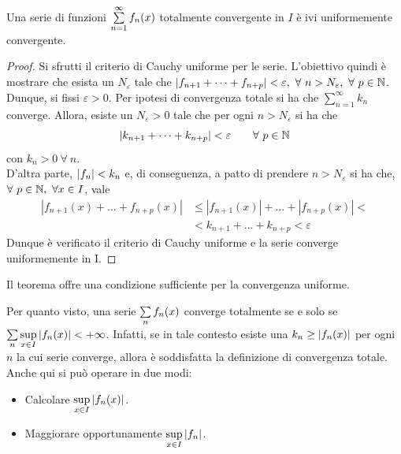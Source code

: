 \begin{theorem} \label{Teo: Criterio di Weierstrass (convergenza totale)}
Una serie di funzioni $\sum\limits_{n=1}^{\infty}{f_n(x)}$ totalmente convergente in $I$ è ivi uniformemente convergente.
\end{theorem}
\begin{proof}
    Si sfrutti il criterio di Cauchy uniforme per le serie. L'obiettivo quindi è mostrare che esista un $N_\varepsilon$ tale che $|f_{n+1}+ \dots+ f_{n+p}|< \varepsilon,\ \forall\ n > N_\varepsilon,\ \forall\ p\in \mathbb{N}$.\\
    Dunque, si fissi $\varepsilon>0$. Per ipotesi di convergenza totale si ha che $\sum\limits_{n=1}^{\infty}{k_n}$ converge. Allora, esiste un $N_\varepsilon>0$ tale che per ogni $n>N_\varepsilon$ si ha che 
    \begin{equation}
        |k_{n+1}+\dots+k_{n+p}|< \varepsilon \qquad \forall\ p \in \mathbb{N}
    \end{equation}
   con $k_n>0\ \forall\ n$.\\
   D'altra parte, $|f_n|<k_n$ e, di conseguenza, a patto di prendere $n> N_\varepsilon$ si ha che, $\forall\ p \in \mathbb{N},\ \forall x \in I$, vale
    \begin{equation}
    \begin{aligned}
        |f_{n+1}(x)+ \dots + f_{n+p}(x)| &\leq |f_{n+1}(x)|+ \dots + |f_{n+p}(x)|<\\ 
        &< k_{n+1}+ \dots + k_{n+p} < \varepsilon
    \end{aligned}
    \end{equation}
    Dunque è verificato il criterio di Cauchy uniforme e la serie converge uniformemente in I.
\end{proof}
\begin{oss}
    Il teorema offre una condizione sufficiente per la convergenza uniforme.
\end{oss}
\begin{oss}
Per quanto visto, una serie $\sum\limits_{n}{f_n(x)}$ converge totalmente se e solo se $\sum\limits_{n}{\sup\limits_{x \in I}{|f_n(x)|}} < +\infty$. Infatti, se in tale contesto esiste una $k_n \geq |f_n(x)|$ per ogni $n$ la cui serie converge, allora è soddisfatta la definizione di convergenza totale.\\
Anche qui si può operare in due modi:
\begin{itemize}
    \item Calcolare $\sup\limits_{x \in I}{|f_n(x)|}$.
    \item Maggiorare opportunamente $\sup\limits_{x \in I}{|f_n|}$.
\end{itemize}
\end{oss}

